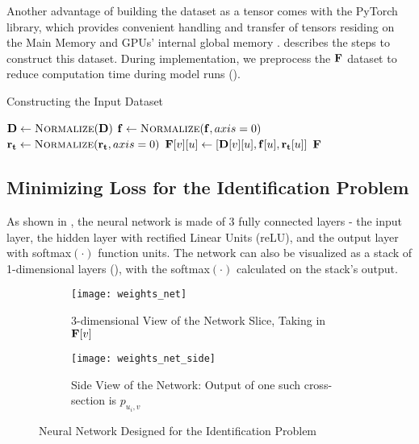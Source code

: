 Another advantage of building the dataset as a tensor comes with the PyTorch library, which provides convenient handling and transfer of tensors residing on the Main Memory and GPUs' internal global memory \cite{PTDocs}.  describes the steps to construct this dataset. During implementation, we preprocess the $\mathbf{F}$ dataset to reduce computation time during model runs ().
\begin{algorithm}[!htbp]
    \caption{Constructing the Input Dataset} \label{alg:Constructing the Input Dataset}
    \begin{algorithmic}[1]
        \State $\matr{D} \gets \Call{Normalize}{\matr{D}}$
        \State $\vect{f} \gets \Call{Normalize}{\mathbf{f}, axis = 0}$
        \State $\vect{r_t} \gets \Call{Normalize}{\vect{r_t}, axis = 0}$
                \State $\mathbf{F}[v][u] \gets [\mathbf{D}[v][u], \mathbf{f}[u], \mathbf{r_t}[u]]$ 
             \EndFor
        \EndFor
        \State \Return $\mathbf{F}$
        \EndFunction
    \end{algorithmic}
\end{algorithm}

\subsection{Minimizing Loss for the Identification Problem} \label{sec:Minimizing Loss for the Identification Problem}
As shown in , the neural network is made of 3 fully connected layers - the input layer, the hidden layer with rectified Linear Units (reLU), and the output layer with softmax$(\cdot)$ function units. The network can also be visualized as a stack of 1-dimensional layers (), with the softmax$(\cdot)$ calculated on the stack's output.
\begin{figure}[!htbp]
    \centering
    \begin{subfigure}{\textwidth}
        \centering
        \texttt{[image: weights\_net]}
        \caption{3-dimensional View of the Network Slice, Taking in $\mathbf{F}[v]$}
        \label{fig:3-dimensional view of the network slice taking in Fv}
    \end{subfigure}
    \begin{subfigure}{.75\textwidth}
        \centering
        \texttt{[image: weights\_net\_side]}
        \caption{Side View of the Network: Output of one such cross-section is $p_{u_i, v}$}
        \label{fig:Side view of the network}
    \end{subfigure}
    \caption{Neural Network Designed for the Identification Problem}
    \label{fig:Neural network designed for the Identification Problem}
\end{figure}

